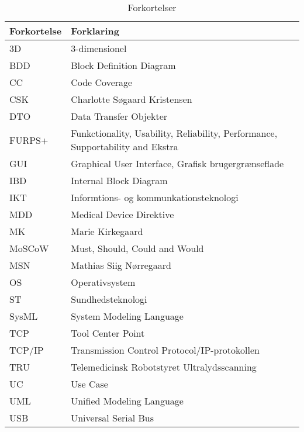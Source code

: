 \begin{table}[htb]
\begin{tabular}{ | m{6em} | m{30em} | } \hline

\textbf{Forkortelse} & \textbf{Forklaring} \\ \hline
3D & 3-dimensionel\\\hline
BDD & Block Definition Diagram \\\hline
CC & Code Coverage \\\hline
CSK & Charlotte Søgaard Kristensen \\ \hline 
DTO & Data Transfer Objekter \\\hline
FURPS+ & Funkctionality, Usability, Reliability, Performance, Supportability and Ekstra \\\hline
GUI & Graphical User Interface, Grafisk brugergrænseflade \\ \hline 
IBD & Internal Block Diagram \\\hline
IKT & Informtions- og kommunkationsteknologi\\\hline
MDD & Medical Device Direktive \\\hline
MK &  Marie Kirkegaard \\ \hline
MoSCoW & Must, Should, Could and Would \\\hline
MSN & Mathias Siig Nørregaard \\ \hline 
OS & Operativsystem \\\hline
ST & Sundhedsteknologi \\\hline
SysML &  System Modeling Language \\\hline
TCP & Tool Center Point \\\hline
TCP/IP & Transmission Control Protocol/IP-protokollen \\\hline
TRU & Telemedicinsk Robotstyret Ultralydsscanning\\\hline
UC & Use Case \\\hline
UML & Unified Modeling Language\\\hline
USB & Universal Serial Bus\\\hline
\end{tabular}
\caption{Forkortelser}
\end{table}
\newpage


